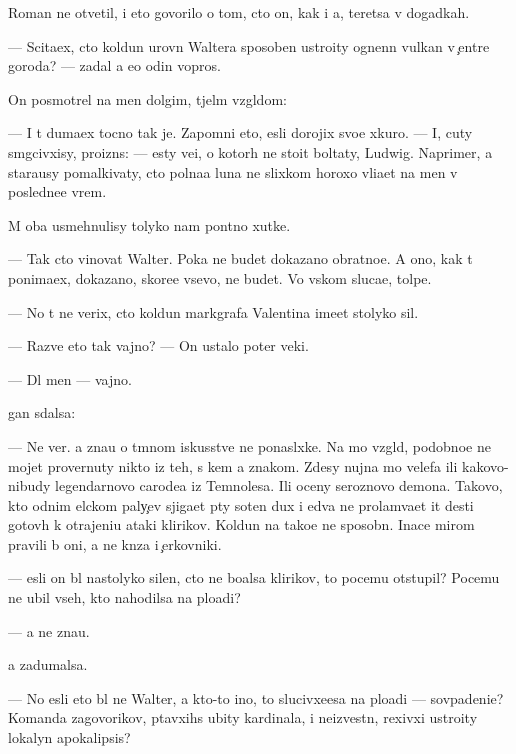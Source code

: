 \documentclass[10pt]{book}
\begin{document}
Roman ne otvetil, i eto govorilo o tom, cto on, kak i {\y}a, ter{\ia}{\y}etsa v dogadkah.

— Scita{\y}ex, cto koldun urovn{\ia} Waltera sposoben ustro{\y}ity ognenn{\yi}{\y} vulkan v {\c}entre goroda? — zadal {\y}a {\y}e{\x}o odin vopros.

On posmotrel na men{\ia} dolgim, t{\ia}jel{\yi}m vzgl{\ia}dom:

— I t{\yi} duma{\y}ex tocno tak je. Zapomni eto, {\y}esli dorojix svo{\y}e{\y} xkuro{\y}. — I, cuty sm{\ia}gcivxisy, proizn{\e}s: — {\Y}esty ve{\x}i, o kotor{\yi}h ne sto{\y}it boltaty, Ludwig. Naprimer, {\y}a stara{\y}usy pomalkivaty, cto polna{\y}a luna ne slixkom horoxo vli{\y}a{\y}et na men{\ia} v posledne{\y}e vrem{\ia}.

M{\yi} oba usmehnulisy tolyko nam pon{\ia}tno{\y} xutke.

— Tak cto vinovat Walter. Poka ne budet dokazano obratno{\y}e. A ono, kak t{\yi} ponima{\y}ex, dokazano, skore{\y}e vsevo, ne budet. Vo vs{\ia}kom sluca{\y}e, tolpe.

— No t{\yi} ne verix, cto koldun markgrafa Valentina ime{\y}et stolyko sil.

— Razve eto tak vajno? — On ustalo poter veki.

— Dl{\ia} men{\ia} — vajno.

{\C}{\yi}gan sdalsa:

— Ne ver{\iu}. {\Y}a zna{\y}u o t{\e}mnom iskusstve ne ponasl{\yi}xke. Na mo{\y} vzgl{\ia}d, podobno{\y}e ne mojet provernuty nikto iz teh, s kem {\y}a znakom. Zdesy nujna mo{\x} velefa ili kakovo-nibudy legendarnovo carode{\y}a iz Temnoles{\y}a. Ili oceny ser{\y}oznovo demona. Takovo, kto odnim {\x}elckom paly{\c}ev sjiga{\y}et p{\ia}ty soten dux i {\y}edva ne prolam{\yi}va{\y}et {\x}it des{\ia}ti gotov{\yi}h k otrajeni{\y}u ataki klirikov. Koldun{\yi} na tako{\y}e ne sposobn{\yi}. Inace mirom pravili b{\yi} oni, a ne kn{\ia}z{\y}a i {\c}erkovniki.

— {\Y}esli on b{\yi}l nastolyko silen, cto ne bo{\y}alsa klirikov, to pocemu otstupil? Pocemu ne ubil vseh, kto nahodilsa na plo{\x}adi?

— {\Y}a ne zna{\y}u.

{\Y}a zadumalsa.

— No {\y}esli eto b{\yi}l ne Walter, a kto-to ino{\y}, to slucivxe{\y}esa na plo{\x}adi — sovpadeni{\y}e? Komanda zagovor{\x}ikov, p{\yi}tavxihs{\ia} ubity kardinala, i ne{\y}izvestn{\yi}{\y}, rexivxi{\y} ustro{\y}ity lokalyn{\yi}{\y} apokalipsis?
\end{document}
